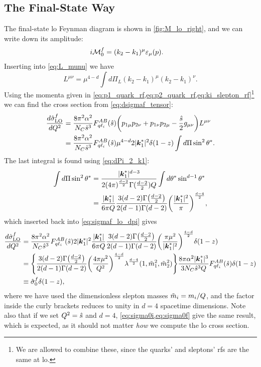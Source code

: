 \subsection{The Final-State Way}
The final-state \gls{lo} Feynman diagram is shown in \cref{fig:M_lo_right}, and we can write down its amplitude:
\begin{align}
    i\mathcal{M}^f_0 &= (k_2-k_1)^\mu\varepsilon_\mu(p).
    \label{eq:Mf0}
\end{align}
Inserting into \cref{eq:L_munu} we have
\begin{equation}
    L^{\mu\nu} = \mu^{4-d} \int d\Pi_L (k_2-k_1)^\mu (k_2-k_1)^\nu.
    \label{eq:L_munu_lo}
\end{equation}
Using the momenta given in \cref{eq:p1_quark_rf,eq:p2_quark_rf,eq:ki_slepton_rf}\footnote{We are allowed to combine these, since the quarks' and sleptons' \glspl{rf} are the same at \gls{lo}.} we can find the cross section from \cref{eq:dsigmaf_tensor}:
\begin{align}
    \frac{d\hat{\sigma}^f_\mathrm{LO}}{dQ^2} &= \frac{8\pi^2\alpha^2}{N_C\hat{s}^3}F_{q\ell_i}^{AB}(\hat{s}) \biggl(p_{1\mu} p_{2\nu} + p_{1\nu} p_{2\mu} - \frac{\hat{s}}{2}g_{\mu\nu} \biggr) L^{\mu\nu}
    \nonumber \\
    &= \frac{8\pi^2\alpha^2}{N_C\hat{s}^3}F_{q\ell_i}^{AB}(\hat{s}) \mu^{4-d}
    2 \lvert\boldsymbol{k}_1^*\rvert^2 \delta(1-z) \int d\Pi \sin^2\theta^*.
    \label{eq:sigmaf_lo_dpi}
\end{align}
The last integral is found using \cref{eq:dPi_2_k1}:
\begin{align}
    \int d\Pi \sin^2\theta^* &= \frac{\lvert\boldsymbol{k}_1^*\rvert^{d-3}}{2(4\pi)^{\frac{d-2}{2}}\Gamma(\frac{d-2}{2})Q}
    \int d\theta^* \sin^{d-1}{\theta^*}
    \nonumber \\
    &= \frac{\lvert\boldsymbol{k}_1^*\rvert}{6\pi Q}
    \frac{3(d-2)\Gamma\bigl(\frac{d-2}{2}\bigr)}{2(d-1)\Gamma(d-2)} \biggl(\frac{\lvert\boldsymbol{k}_1^*\rvert^2}{\pi}\biggr)^{\frac{d-4}{2}},
\end{align}
which inserted back into \cref{eq:sigmaf_lo_dpi} gives
\begin{align}
    \frac{d\hat{\sigma}^f_\mathrm{LO}}{dQ^2} &= \frac{8\pi^2\alpha^2}{N_C\hat{s}^3}F_{q\ell_i}^{AB}(\hat{s})
    2 \lvert\boldsymbol{k}_1^*\rvert^2
    \frac{\lvert\boldsymbol{k}_1^*\rvert}{6\pi Q}
    \frac{3(d-2)\Gamma\bigl(\frac{d-2}{2}\bigr)}{2(d-1)\Gamma(d-2)}
    \biggl(\frac{\pi \mu^2}{\lvert\boldsymbol{k}_1^*\rvert^2}\biggr)^{\frac{4-d}{2}} \delta(1-z)
    \nonumber \\
    &= \Biggl\{
        \frac{3(d-2)\Gamma\bigl(\frac{d-2}{2}\bigr)}{2(d-1)\Gamma(d-2)}
        \biggl(\frac{4\pi \mu^2}{Q^2}\biggr)^{\frac{4-d}{2}} \lambda^{\frac{d-4}{2}}(1,\tilde{m}_1^2,\tilde{m}_2^2)
    \Biggr\}
    \frac{8\pi\alpha^2 \lvert\boldsymbol{k}_1^*\rvert^3}{3N_C\hat{s}^3 Q}F_{q\ell_i}^{AB}(\hat{s})
    \delta(1-z)
    \nonumber \\
    &\equiv \hat{\sigma}^f_0 \delta(1-z),
    \label{eq:sigma0f}
\end{align}
where we have used the dimensionless slepton masses $\tilde{m}_i=m_i/Q$, and the factor inside the curly brackets reduces to unity in $d=4$ spacetime dimensions.
Note also that if we set $Q^2 = \hat{s}$ and $d=4$, \cref{eq:sigma0i,eq:sigma0f} give the same result, which is expected, as it should not matter \textit{how} we compute the \gls{lo} cross section.




